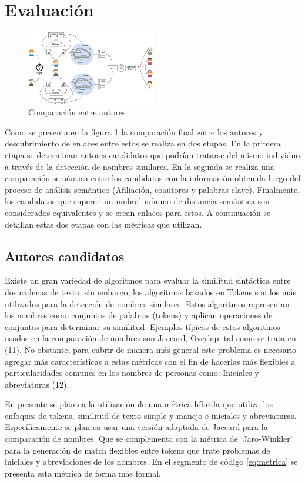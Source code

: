\documentclass[conference]{IEEEtran}
\begin{document}
\section{Evaluación}

\begin{figure}[!t]
\centering
\includegraphics[width=0.5\textwidth]{proceso}
\caption{Comparaci\'on entre autores}
\label{fig:comparacion}
\end{figure}

Como se presenta en la figura \ref{fig:comparacion} la comparación final entre los autores y descubrimiento de enlaces entre estos se realiza en dos etapas. En la primera etapa se determinan autores candidatos que podrían tratarse del mismo individuo a través de la detección de nombres similares. En la segunda se realiza una comparación semántica entre los candidatos con la información obtenida luego del proceso de análisis semántico (Afiliación, coautores y palabras clave). Finalmente, los candidatos que superen un umbral mínimo de distancia semántica son considerados equivalentes y se crean enlaces para estos. A continuación se detallan estas dos etapas con las métricas que utilizan.

\subsection{Autores candidatos}
Existe un gran variedad de algoritmos para evaluar la similitud sintáctica entre dos cadenas de texto, sin embargo, los algoritmos basados en Tokens son los más utilizados para la detección de nombres similares. Estos algoritmos representan los nombres como conjuntos de palabras (tokens) y aplican operaciones de conjuntos para determinar su similitud. Ejemplos típicos de estos algoritmos usados en la comparación de nombres son Jaccard, Overlap, tal como se trata en  (11). No obstante, para cubrir de manera más general este problema es necesario agregar más características a estas métricas con el fin de hacerlas más flexibles a particularidades comunes en los nombres de personas como: Iniciales y abreviaturas (12).

En presente se plantea la utilización de una métrica híbrida que utiliza los enfoques de tokens, similitud de texto simple y manejo e iniciales y abreviaturas. Específicamente se plantea usar una versión adaptada de Jaccard para la comparación de nombres. Que se complementa con la  métrica de ‘Jaro-Winkler’ para la generación de  match flexibles entre tokens que trate problemas de iniciales y abreviaciones de los nombres. En el segmento de código \ref{eq:metrica} se presenta esta métrica de forma más formal.
\end{document}
